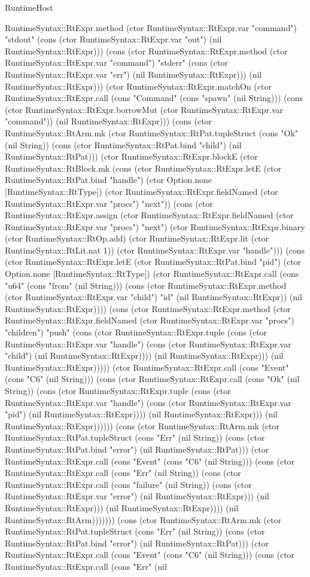 \begin{lexlean}{RuntimeHost}
\begin{semanticmodule}
{RuntimeSyntax::RtExpr.method (ctor RuntimeSyntax::RtExpr.var "command") "stdout" (cons (ctor RuntimeSyntax::RtExpr.var "out") (nil RuntimeSyntax::RtExpr))) (cons (ctor RuntimeSyntax::RtExpr.method (ctor RuntimeSyntax::RtExpr.var "command") "stderr" (cons (ctor RuntimeSyntax::RtExpr.var "err") (nil RuntimeSyntax::RtExpr))) (nil RuntimeSyntax::RtExpr))) (ctor RuntimeSyntax::RtExpr.matchOn (ctor RuntimeSyntax::RtExpr.call (cons "Command" (cons "spawn" (nil String))) (cons (ctor RuntimeSyntax::RtExpr.borrowMut (ctor RuntimeSyntax::RtExpr.var "command")) (nil RuntimeSyntax::RtExpr))) (cons (ctor RuntimeSyntax::RtArm.mk (ctor RuntimeSyntax::RtPat.tupleStruct (cons "Ok" (nil String)) (cons (ctor RuntimeSyntax::RtPat.bind "child") (nil RuntimeSyntax::RtPat))) (ctor RuntimeSyntax::RtExpr.blockE (ctor RuntimeSyntax::RtBlock.mk (cons (ctor RuntimeSyntax::RtExpr.letE (ctor RuntimeSyntax::RtPat.bind "handle") (ctor Option.none [RuntimeSyntax::RtType]) (ctor RuntimeSyntax::RtExpr.fieldNamed (ctor RuntimeSyntax::RtExpr.var "procs") "next")) (cons (ctor RuntimeSyntax::RtExpr.assign (ctor RuntimeSyntax::RtExpr.fieldNamed (ctor RuntimeSyntax::RtExpr.var "procs") "next") (ctor RuntimeSyntax::RtExpr.binary (ctor RuntimeSyntax::RtOp.add) (ctor RuntimeSyntax::RtExpr.lit (ctor RuntimeSyntax::RtLit.nat 1)) (ctor RuntimeSyntax::RtExpr.var "handle"))) (cons (ctor RuntimeSyntax::RtExpr.letE (ctor RuntimeSyntax::RtPat.bind "pid") (ctor Option.none [RuntimeSyntax::RtType]) (ctor RuntimeSyntax::RtExpr.call (cons "u64" (cons "from" (nil String))) (cons (ctor RuntimeSyntax::RtExpr.method (ctor RuntimeSyntax::RtExpr.var "child") "id" (nil RuntimeSyntax::RtExpr)) (nil RuntimeSyntax::RtExpr)))) (cons (ctor RuntimeSyntax::RtExpr.method (ctor RuntimeSyntax::RtExpr.fieldNamed (ctor RuntimeSyntax::RtExpr.var "procs") "children") "push" (cons (ctor RuntimeSyntax::RtExpr.tuple (cons (ctor RuntimeSyntax::RtExpr.var "handle") (cons (ctor RuntimeSyntax::RtExpr.var "child") (nil RuntimeSyntax::RtExpr)))) (nil RuntimeSyntax::RtExpr))) (nil RuntimeSyntax::RtExpr))))) (ctor RuntimeSyntax::RtExpr.call (cons "Event" (cons "C6" (nil String))) (cons (ctor RuntimeSyntax::RtExpr.call (cons "Ok" (nil String)) (cons (ctor RuntimeSyntax::RtExpr.tuple (cons (ctor RuntimeSyntax::RtExpr.var "handle") (cons (ctor RuntimeSyntax::RtExpr.var "pid") (nil RuntimeSyntax::RtExpr)))) (nil RuntimeSyntax::RtExpr))) (nil RuntimeSyntax::RtExpr)))))) (cons (ctor RuntimeSyntax::RtArm.mk (ctor RuntimeSyntax::RtPat.tupleStruct (cons "Err" (nil String)) (cons (ctor RuntimeSyntax::RtPat.bind "error") (nil RuntimeSyntax::RtPat))) (ctor RuntimeSyntax::RtExpr.call (cons "Event" (cons "C6" (nil String))) (cons (ctor RuntimeSyntax::RtExpr.call (cons "Err" (nil String)) (cons (ctor RuntimeSyntax::RtExpr.call (cons "failure" (nil String)) (cons (ctor RuntimeSyntax::RtExpr.var "error") (nil RuntimeSyntax::RtExpr))) (nil RuntimeSyntax::RtExpr))) (nil RuntimeSyntax::RtExpr)))) (nil RuntimeSyntax::RtArm))))))) (cons (ctor RuntimeSyntax::RtArm.mk (ctor RuntimeSyntax::RtPat.tupleStruct (cons "Err" (nil String)) (cons (ctor RuntimeSyntax::RtPat.bind "error") (nil RuntimeSyntax::RtPat))) (ctor RuntimeSyntax::RtExpr.call (cons "Event" (cons "C6" (nil String))) (cons (ctor RuntimeSyntax::RtExpr.call (cons "Err" (nil }
\end{semanticmodule}
\end{lexlean}
